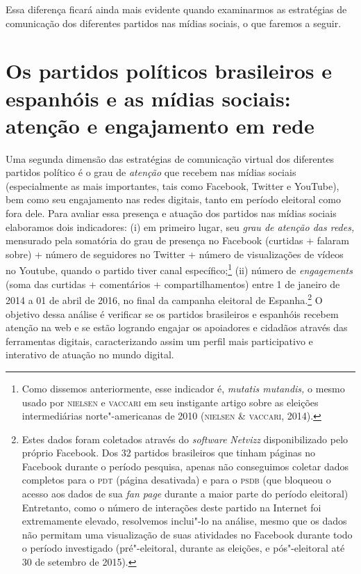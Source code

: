 Essa diferença ficará ainda mais evidente quando examinarmos as
estratégias de comunicação dos diferentes partidos nas mídias sociais, o
que faremos a seguir.

\section{Os partidos políticos brasileiros e espanhóis e as mídias sociais:
atenção e engajamento em rede}

\noindent{}Uma segunda dimensão das estratégias de comunicação virtual dos
diferentes partidos político é o grau de \emph{atenção} que recebem nas
mídias sociais (especialmente as mais importantes, tais como Facebook,
Twitter e YouTube), bem como seu engajamento nas redes digitais, tanto
em período eleitoral como fora dele. Para avaliar essa presença e
atuação dos partidos nas mídias sociais elaboramos dois indicadores: (i)
em primeiro lugar, seu \emph{grau de atenção das redes,} mensurado pela
somatória do grau de presença no Facebook (curtidas + falaram sobre) +
número de seguidores no Twitter + número de visualizações de vídeos no
Youtube, quando o partido tiver canal específico;\footnote{Como dissemos
  anteriormente, esse indicador é, \emph{mutatis mutandis,} o mesmo
  usado por \textsc{nielsen} e \textsc{vaccari} em seu instigante artigo sobre as eleições
  intermediárias norte"-americanas de 2010 (\textsc{nielsen} \& \textsc{vaccari}, 2014).}
(ii) número de \emph{engagements} (soma das curtidas + comentários +
compartilhamentos) entre 1 de janeiro de 2014 a 01 de abril de 2016, no
final da campanha eleitoral de Espanha.\footnote{Estes dados foram
  coletados através do \emph{\emph{software}} \emph{Netvizz} disponibilizado pelo
  próprio Facebook. Dos 32 partidos brasileiros que tinham páginas no
  Facebook durante o período pesquisa, apenas não conseguimos coletar
  dados completos para o \textsc{pdt} (página desativada) e para o \textsc{psdb} (que
  bloqueou o acesso aos dados de sua \emph{fan page} durante a maior
  parte do período eleitoral) Entretanto, como o número de interações
  deste partido na Internet foi extremamente elevado, resolvemos
  inclui"-lo na análise, mesmo que os dados não permitam uma visualização
  de suas atividades no Facebook durante todo o período investigado
  (pré"-eleitoral, durante as eleições, e pós"-eleitoral até 30 de
  setembro de 2015).} O objetivo dessa análise é verificar se os
partidos brasileiros e espanhóis recebem atenção na web e se estão
logrando engajar os apoiadores e cidadãos através das ferramentas
digitais, caracterizando assim um perfil mais participativo e interativo
de atuação no mundo digital.

